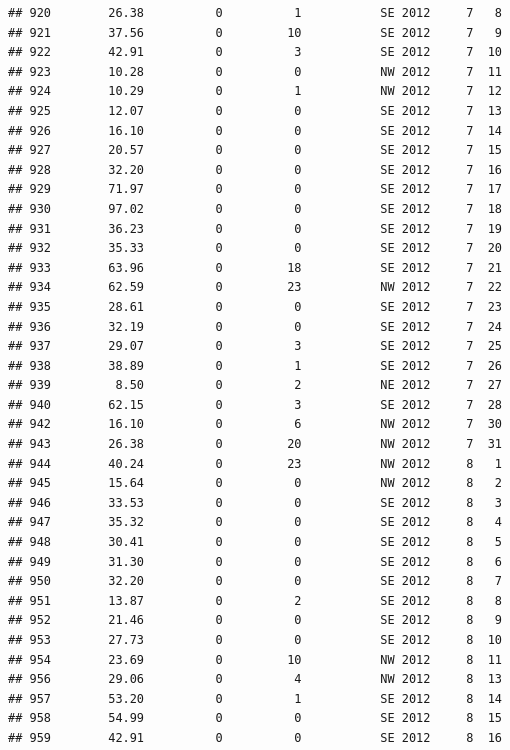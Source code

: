 \documentclass[
]{article}
\begin{document}
\begin{verbatim}
## 920        26.38          0          1           SE 2012     7   8
## 921        37.56          0         10           SE 2012     7   9
## 922        42.91          0          3           SE 2012     7  10
## 923        10.28          0          0           NW 2012     7  11
## 924        10.29          0          1           NW 2012     7  12
## 925        12.07          0          0           SE 2012     7  13
## 926        16.10          0          0           SE 2012     7  14
## 927        20.57          0          0           SE 2012     7  15
## 928        32.20          0          0           SE 2012     7  16
## 929        71.97          0          0           SE 2012     7  17
## 930        97.02          0          0           SE 2012     7  18
## 931        36.23          0          0           SE 2012     7  19
## 932        35.33          0          0           SE 2012     7  20
## 933        63.96          0         18           SE 2012     7  21
## 934        62.59          0         23           NW 2012     7  22
## 935        28.61          0          0           SE 2012     7  23
## 936        32.19          0          0           SE 2012     7  24
## 937        29.07          0          3           SE 2012     7  25
## 938        38.89          0          1           SE 2012     7  26
## 939         8.50          0          2           NE 2012     7  27
## 940        62.15          0          3           SE 2012     7  28
## 942        16.10          0          6           NW 2012     7  30
## 943        26.38          0         20           NW 2012     7  31
## 944        40.24          0         23           NW 2012     8   1
## 945        15.64          0          0           NW 2012     8   2
## 946        33.53          0          0           SE 2012     8   3
## 947        35.32          0          0           SE 2012     8   4
## 948        30.41          0          0           SE 2012     8   5
## 949        31.30          0          0           SE 2012     8   6
## 950        32.20          0          0           SE 2012     8   7
## 951        13.87          0          2           SE 2012     8   8
## 952        21.46          0          0           SE 2012     8   9
## 953        27.73          0          0           SE 2012     8  10
## 954        23.69          0         10           NW 2012     8  11
## 956        29.06          0          4           NW 2012     8  13
## 957        53.20          0          1           SE 2012     8  14
## 958        54.99          0          0           SE 2012     8  15
## 959        42.91          0          0           SE 2012     8  16

\end{verbatim}
\end{document}
